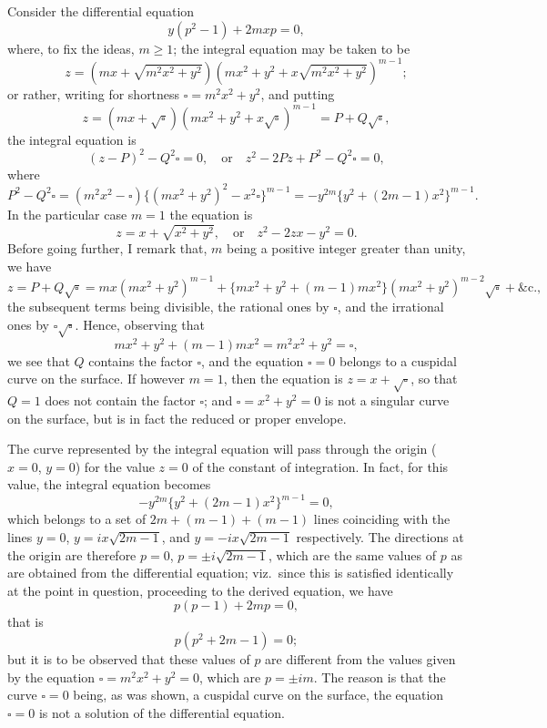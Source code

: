 \documentclass[11pt,a4paper]{article}
\theoremstyle{plain}
\begin{document}
Consider the differential equation
\[
y(p^2 - 1) + 2 m x p = 0,
\]
where, to fix the ideas, $m \geq 1$; the integral equation may be taken to be
\[
z = (m x + \sqrt{m^2 x^2 + y^2})(m x^2 + y^2 + x\sqrt{m^2 x^2 + y^2})^{m-1};
\]
or rather, writing for shortness $\square = m^2 x^2 + y^2$, and putting
\[
z = (m x + \sqrt{\square})(m x^2 + y^2 + x\sqrt{\square})^{m-1} = P + Q\sqrt{\square},
\]
the integral equation is
\[
(z - P)^2 - Q^2 \square = 0,\quad \text{or}\quad z^2 - 2 P z + P^2 - Q^2 \square = 0,
\]
where
\[
P^2 - Q^2 \square = (m^2 x^2 - \square)\{(m x^2 + y^2)^2 - x^2 \square\}^{m-1} = -y^{2m}\{y^2 + (2m - 1)x^2\}^{m-1}.
\]
In the particular case $m = 1$ the equation is
\[
z = x + \sqrt{x^2 + y^2},\quad \text{or}\quad z^2 - 2 z x - y^2 = 0.
\]
\newpage
Before going further, I remark that, $m$ being a positive integer greater than unity, we have
\[
z = P + Q\sqrt{\square} = m x (m x^2 + y^2)^{m-1} + \{m x^2 + y^2 + (m - 1)m x^2\}(m x^2 + y^2)^{m-2}\sqrt{\square} + \&\text{c.},
\]
the subsequent terms being divisible, the rational ones by $\square$, and the irrational ones by $\square\sqrt{\square}$. Hence, observing that
\[
m x^2 + y^2 + (m - 1)m x^2 = m^2 x^2 + y^2 = \square,
\]
we see that $Q$ contains the factor $\square$, and the equation $\square = 0$ belongs to a cuspidal curve on the surface. If however $m = 1$, then the equation is $z = x + \sqrt{\square}$, so that $Q = 1$ does not contain the factor $\square$; and $\square = x^2 + y^2 = 0$ is not a singular curve on the surface, but is in fact the reduced or proper envelope.

The curve represented by the integral equation will pass through the origin ($x = 0$, $y = 0$) for the value $z = 0$ of the constant of integration. In fact, for this value, the integral equation becomes
\[
-y^{2m}\{y^2 + (2m - 1)x^2\}^{m-1} = 0,
\]
which belongs to a set of $2m + (m-1) + (m-1)$ lines coinciding with the lines $y = 0$, $y = i x\sqrt{2m - 1}$, and $y = -i x\sqrt{2m - 1}$ respectively. The directions at the origin are therefore $p = 0$, $p = \pm i\sqrt{2m - 1}$, which are the same values of $p$ as are obtained from the differential equation; viz.\ since this is satisfied identically at the point in question, proceeding to the derived equation, we have
\[
p(p - 1) + 2 m p = 0,
\]
that is
\[
p(p^2 + 2 m - 1) = 0;
\]
but it is to be observed that these values of $p$ are different from the values given by the equation $\square = m^2 x^2 + y^2 = 0$, which are $p = \pm i m$. The reason is that the curve $\square = 0$ being, as was shown, a cuspidal curve on the surface, the equation $\square = 0$ is not a solution of the differential equation.
\end{document}
